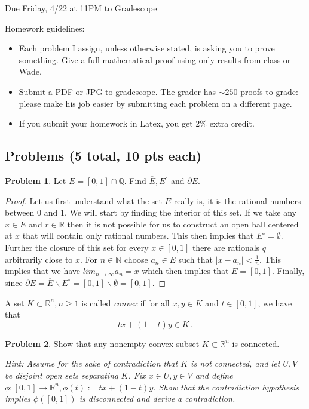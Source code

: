 \documentclass[11pt]{article}
\theoremstyle{definition}
\newtheorem{problem}{Problem}
\newcommand{\N}{\mathbb{N}}
\newcommand{\R}{\mathbb{R}}
\begin{document}
  \hfill Due Friday, 4/22 at 11PM to Gradescope

\bigskip

\noindent Homework guidelines: 
\begin{itemize}
\item Each problem I assign, unless otherwise stated, is asking you to prove something. Give a full mathematical proof using only results from class or Wade.
\item Submit a PDF or JPG to gradescope. The grader has $\sim 250$ proofs to grade:  please make his job easier by submitting each problem on a different page. 
\item If you submit your homework in Latex, you get 2\% extra credit. 
\end{itemize}


\subsection*{Problems (5 total, 10 pts each)}

\begin{problem}
Let $E = [0,1] \cap \mathbb Q$. Find $\overline{E}, E^\circ$ and $\partial E$. 
\end{problem}

\begin{proof}
Let us first understand what the set $E$ really is, it is the rational numbers between 0 and 1. We will start by finding the interior of this set. If we take any $x\in E$ and $r\in \R$ then it is not possible for us to construct an open ball centered at $x$ that will contain only rational numbers. This then implies that $E^\circ = \emptyset$. Further the closure of this set for every $x\in [0, 1]$ there are rationals $q$ arbitrarily close to $x.$ For $n\in \N$ choose $a_n \in E$ such that $|x-a_n|<\frac{1}{n}.$ This implies that we have $lim_{n\to \infty}a_n = x$ which then implies that $\overline{E} = [0,1].$ Finally, since $\partial E = \overline{E} \backslash E^\circ = [0,1]\backslash \emptyset = [0,1].$
\end{proof}

\pagebreak
A set $K \subset \R^n, n \geq 1$ is called \emph{convex} if for all $x, y \in K$ and $t \in [0,1]$, we have that 
\[
t x + (1 - t) y \in K \,. 
\]
\begin{problem}
Show that any nonempty convex subset $K \subset \R^n$ is connected. 

\emph{Hint: Assume for the sake of contradiction that $K$ is not connected, and let $U, V$ be disjoint open sets separating $K$. Fix $x \in U, y \in V$ and define $\phi : [0,1] \to \R^n, \phi(t) := t x + (1 - t) y$. Show that the contradiction hypothesis implies $\phi([0,1])$ is disconnected and derive a contradiction. }
\end{problem}
\end{document}
